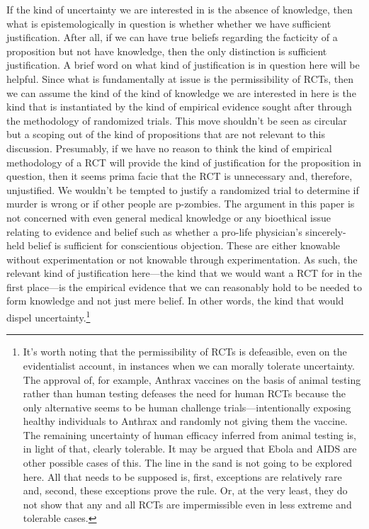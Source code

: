 \documentclass[letterpaper,notitlepage,12pt]{article}
\begin{document}
If the kind of uncertainty we are interested in is the absence of knowledge,
then what is epistemologically in question is whether whether we have sufficient
justification.
After all, if we can have true beliefs regarding the facticity of
a proposition but not have knowledge, then the only distinction is sufficient
justification.
A brief word on what kind of justification is in question here will be helpful.
Since what is fundamentally at issue is the permissibility of RCTs, then we can
assume the kind of the kind of knowledge we are interested in here is the kind
that is instantiated by the kind of empirical evidence sought after through the
methodology of randomized trials.
This move shouldn't be seen as circular but a scoping out of the kind of
propositions that are not relevant to this discussion.
Presumably, if we have no reason to think the kind of empirical methodology of a
RCT will provide the kind of justification for the proposition in question, then
it seems prima facie that the RCT is unnecessary and, therefore, unjustified.
We wouldn't be tempted to justify a randomized trial to determine if murder is
wrong or if other people are p-zombies.
The argument in this paper is not concerned with even general medical knowledge
or any bioethical issue relating to evidence and belief such as whether a
pro-life physician's sincerely-held belief is sufficient for conscientious
objection.
These are either knowable without experimentation or not knowable through
experimentation.
As such, the relevant kind of justification here---the kind that we would want a 
RCT for in the first place---is the empirical evidence that we can reasonably
hold to be needed to form knowledge and not just mere belief.
In other words, the kind that would dispel uncertainty.\footnote{It's worth
  noting that the permissibility of RCTs is defeasible, even on the
  evidentialist account, in instances when we can morally tolerate uncertainty.
  The approval of, for example, Anthrax vaccines on the basis of animal
  testing rather than human testing defeases the need for human RCTs because the
  only alternative seems to be human challenge trials---intentionally exposing
  healthy individuals to Anthrax and randomly not giving them the vaccine. The
  remaining uncertainty of human efficacy inferred from animal testing is, in
  light of that, clearly tolerable. It may be argued that Ebola and AIDS are
  other possible cases of this. The line in the sand is not going to be explored
  here. All that needs to be supposed is, first, exceptions are relatively rare
  and, second, these exceptions prove the rule. Or, at the very least, they do
  not show that any and all RCTs are impermissible even in less extreme and
tolerable cases.}
\end{document}
